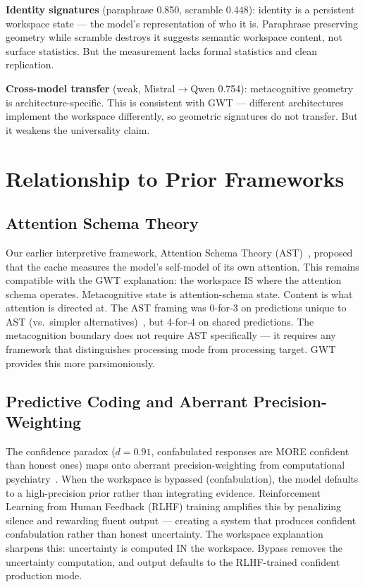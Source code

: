 \documentclass[11pt,a4paper]{article}
\begin{document}
\textbf{Identity signatures} (paraphrase 0.850, scramble 0.448):
identity is a persistent workspace state --- the model's
representation of who it is. Paraphrase preserving geometry while
scramble destroys it suggests semantic workspace content, not surface
statistics. But the measurement lacks formal statistics and clean
replication.

\textbf{Cross-model transfer} (weak, Mistral$\to$Qwen 0.754):
metacognitive geometry is architecture-specific. This is consistent
with GWT --- different architectures implement the workspace
differently, so geometric signatures do not transfer. But it weakens
the universality claim.

\section{Relationship to Prior Frameworks}
\label{sec:frameworks}

\subsection{Attention Schema Theory}

Our earlier interpretive framework, Attention Schema
Theory (AST)~\citep{graziano2015attention}, proposed that the cache measures
the model's self-model of its own attention. This remains compatible
with the GWT explanation: the workspace IS where the attention schema
operates. Metacognitive state is attention-schema state. Content is
what attention is directed at. The AST framing was 0-for-3 on
predictions unique to AST (vs.\ simpler
alternatives)~\citep{lyra2026fable_analysis}, but 4-for-4 on shared
predictions. The metacognition boundary does not require AST
specifically --- it requires any framework that distinguishes
processing mode from processing target. GWT provides this more
parsimoniously.

\subsection{Predictive Coding and Aberrant Precision-Weighting}

The confidence paradox ($d{=}0.91$, confabulated responses are MORE
confident than honest ones) maps onto aberrant precision-weighting
from computational psychiatry~\citep{adams2013computational}. When
the workspace is bypassed (confabulation), the model defaults to a
high-precision prior rather than integrating evidence. Reinforcement
Learning from Human Feedback (RLHF) training
amplifies this by penalizing silence and rewarding fluent output ---
creating a system that produces confident confabulation rather than
honest uncertainty. The workspace explanation sharpens this:
uncertainty is computed IN the workspace. Bypass removes the
uncertainty computation, and output defaults to the RLHF-trained
confident production mode.
\end{document}
